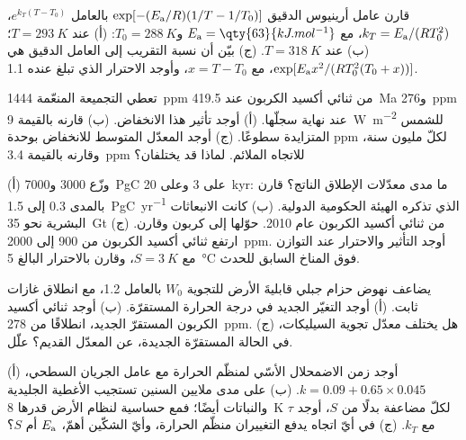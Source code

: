 \begin{exercise}[$\star\star$]\label{exo:b2:deep-time-climate:6}
قارن عامل أرينيوس الدقيق $\exp[-(E_{\text a}/R)(1/T - 1/T_0)]$ بالعامل $e^{k_T(T -
T_0)}$، $k_T = E_{\text a}/(RT_0^2)$، مع $E_{\text a} = \qty{63}{kJ.mol^{-1}}$ و$T_0 =
\qty{288}{K}$: (أ) عند $T = \qty{293}{K}$؛ (ب) عند $T = \qty{318}{K}$. (ج) بيّن أن نسبة
التقريب إلى العامل الدقيق هي $\exp[E_{\text a}x^2/(RT_0^2(T_0 + x))]$، مع $x = T - T_0$،
وأوجد الاحترار الذي تبلغ عنده 1.1.
\end{exercise}

\begin{exercise}[$\star\star$]\label{exo:b2:deep-time-climate:7}
تعطي التجميعة المنعّمة \qty{1444}{ppm} من ثنائي أكسيد الكربون عند \qty{419.5}{Ma}
و\qty{276}{ppm} عند نهاية سجلّها. (أ) أوجد تأثير هذا الانخفاض. (ب) قارنه
بالقيمة \qty{9}{W.m^{-2}} للشمس المتزايدة سطوعًا. (ج) أوجد المعدّل المتوسط للانخفاض بوحدة ppm لكلّ مليون
سنة، وقارنه بالقيمة \qty{3.4}{ppm} للاتجاه الملائم. لماذا قد يختلفان؟
\end{exercise}

\begin{exercise}[$\star\star$]\label{exo:b2:deep-time-climate:8}
(أ) وزّع \num{3000} و\qty{7000}{PgC} على 3 وعلى \qty{20}{kyr}: ما مدى معدّلات
الإطلاق الناتج؟ قارن بالمدى 0.3 إلى \qty{1.5}{PgC.yr^{-1}} الذي تذكره الهيئة الحكومية الدولية. (ب) كانت الانبعاثات البشرية
نحو \qty{35}{Gt} من ثنائي أكسيد الكربون عام 2010. حوّلها إلى كربون وقارن. (ج) ارتفع ثنائي أكسيد
الكربون من 900 إلى \qty{2000}{ppm}. أوجد التأثير والاحترار عند التوازن مع $S =
\qty{3}{K}$، وقارن بالاحترار البالغ \qty{5}{\celsius} فوق المناخ السابق للحدث.
\end{exercise}

\begin{exercise}[$\star\star$]\label{exo:b2:deep-time-climate:9}
يضاعف نهوض حزام جبلي قابليةَ الأرض للتجوية $W_0$ بالعامل 1.2، مع انطلاق غازات
ثابت. (أ) أوجد التغيّر الجديد في درجة الحرارة المستقرّة. (ب) أوجد ثنائي أكسيد الكربون المستقرّ الجديد، انطلاقًا من
\qty{278}{ppm}. (ج) هل يختلف معدّل تجوية السيليكات، في الحالة المستقرّة الجديدة، عن
المعدّل القديم؟ علّل.
\end{exercise}

\begin{exercise}[$\star\star\star$]\label{exo:b2:deep-time-climate:10}
(أ) أوجد زمن الاضمحلال الأسّي لمنظّم الحرارة مع عامل الجريان السطحي، $k = 0.09 + 0.65\times0.045$.
(ب) على مدى ملايين السنين تستجيب الأغطية الجليدية والنباتات أيضًا؛ فمع حساسية لنظام الأرض
قدرها \qty{8}{K} لكلّ مضاعفة بدلًا من $S$، أوجد $\tau$ مع $k_T$. (ج) في أيّ اتجاه يدفع
التغييران منظّم الحرارة، وأيّ الشكّين أهمّ، $E_{\text a}$ أم $S$؟
\end{exercise}

